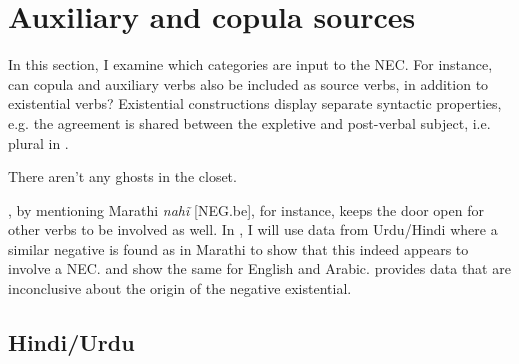 ﻿\documentclass[output=paper]{langsci/langscibook}
\begin{document}
\section{Auxiliary and copula sources}\label{sec:oth-2}

In this section, I examine which categories are input to the NEC. For
instance, can copula and auxiliary verbs also be included as source verbs,
in addition to existential verbs? Existential constructions display
separate syntactic properties, e.g. the agreement is shared between the
expletive and post-verbal subject, i.e. plural in
.
%
\begin{exe}\ex
    \label{ex:other-ghosts}
          There aren't any ghosts in the closet.
    \end{exe}
%
\citet[12]{Croft1991}, by mentioning Marathi
\textit{nahĩ} [NEG.be], for instance, keeps the door open for other verbs
to be involved as well. In , I will use data from
Urdu\slash Hindi where a similar negative is found as in Marathi to show
that this indeed appears to involve a NEC.  and
 show the same for English and
Arabic.  provides data that are
inconclusive about the origin of the negative existential.

\subsection{Hindi\slash Urdu}\label{sec:oth-2.1}
\end{document}

